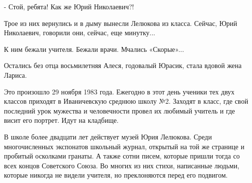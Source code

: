 - Стой, ребята! Как же Юрий Николаевич?!

Трое из них вернулись и в дыму вынесли Лелюкова из класса. Сейчас, Юрий
Николаевич, говорили они, сейчас, еще минутку...

К ним бежали учителя. Бежали врачи. Мчались «Скорые»...

Остались без отца восьмилетняя Алеся, годовалый Юрасик, стала вдовой жена Лариса.

Это произошло 29 ноября 1983 года. Ежегодно в этот день ученики тех двух
классов приходят в Иваничевскую среднюю школу №2. Заходят в класс, где свой
последний урок мужества и человечности провел их любимый учитель и где висит
его портрет. Идут на кладбище.

В школе более двадцати лет действует музей Юрия Лелюкова. Среди многочисленных
экспонатов школьный журнал, открытый на той же странице и пробитый осколками
гранаты. А также сотни писем, которые пришли тогда со всех концов Советского
Союза. Во многих из них стихи, написанные людьми, которые никогда не видели
учителя, но преклоняются перед его подвигом.

